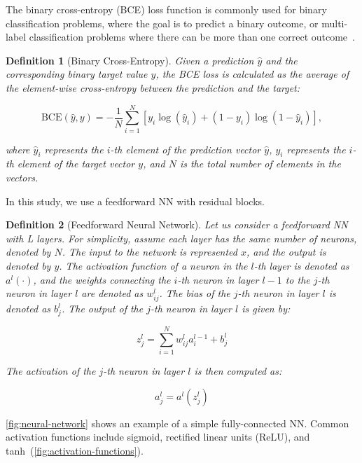 \documentclass[ppgc,diss,english]{iiufrgs}
\newtheorem{definition}{Definition}
\begin{document}
The binary cross-entropy (BCE) loss function is commonly used for binary classification problems, where the goal is to predict a binary outcome, or multi-label classification problems where there can be more than one correct outcome~\cite{Tsoumakas.etal/2007}.
\begin{definition}[Binary Cross-Entropy]\label{def:mse}
Given a prediction $\hat{y}$ and the corresponding binary target value $y$, the BCE loss is calculated as the average of the element-wise cross-entropy between the prediction and the target:

$$\text{BCE}(\hat{y}, y) = -\frac{1}{N} \sum_{i=1}^{N} \left[y_i \log(\hat{y}_i) + (1 - y_i) \log(1 - \hat{y}_i)\right],$$

where $\hat{y}_i$ represents the $i$-th element of the prediction vector $\hat{y}$, $y_i$ represents the $i$-th element of the target vector $y$, and $N$ is the total number of elements in the vectors.
\end{definition}

In this study, we use a feedforward NN with residual blocks.

\begin{definition}[Feedforward Neural Network]
Let us consider a feedforward NN with L layers. For simplicity, assume each layer has the same number of neurons, denoted by $N$. The input to the network is represented $x$, and the output is denoted by $y$. The activation function of a neuron in the $l$-th layer is denoted as $a^l(\cdot)$, and the weights connecting the $i$-th neuron in layer $l-1$ to the $j$-th neuron in layer $l$ are denoted as $w^{l}_{ij}$. The bias of the $j$-th neuron in layer $l$ is denoted as $b^{l}_{j}$. The output of the $j$-th neuron in layer $l$ is given by:

$$z^{l}_{j} = \sum_{i=1}^{N} w^{l}_{ij} a^{l-1}_{i} + b^{l}_{j}$$

The activation of the $j$-th neuron in layer $l$ is then computed as:

$$a^{l}_{j} = a^{l}(z^{l}_{j})$$
\end{definition}

\cref{fig:neural-network} shows an example of a simple fully-connected NN. Common activation functions include sigmoid, rectified linear units (ReLU), and tanh~(\cref{fig:activation-functions}).
\end{document}

